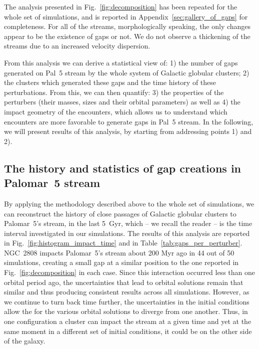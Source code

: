 \documentclass[draft]{aa}
\begin{document}
    The analysis presented in Fig.~\ref{fig:decomposition} has been repeated for the whole set of simulations, and is reported in Appendix~\ref{sec:gallery_of_gaps} for completeness. For all of the streams, morphologically speaking, the only changes appear to be the existence of gaps or not. We do not observe a thickening of the streams due to an increased velocity dispersion. 
    
    From this analysis we can derive a statistical view of: 1) the number of gaps generated on Pal~5 stream by the whole system of Galactic globular clusters; 2) the clusters which generated these gaps and the time history of these perturbations. From this, we can then quantify: 3) the properties of the perturbers (their masses, sizes and their orbital parameters) as well as 4) the impact geometry of the encounters, which allows us to understand which encounters are more favorable to generate gaps in Pal~5 stream. In the following, we will present results of this analysis, by starting from addressing points 1) and 2).





  \subsection{The history and statistics of gap creations in Palomar~5 stream}\label{sect:history}
  

      


    By applying the methodology described above to the whole set of simulations, we can reconstruct the history of close passages of Galactic globular clusters to Palomar~5's stream, in the last 5~Gyr, which -- we recall the reader -- is the time interval investigated in our simulations. The results of this analysis are reported in Fig.~\ref{fig:histogram_impact_time} and in Table~\ref{tab:gaps_per_perturber}. NGC~2808 impacts Palomar~5's stream about 200 Myr ago in 44 out of 50 simulations, creating a small gap at a similar position to the one reported in Fig.~\ref{fig:decomposition} in each case. Since this interaction occurred less than one orbital period ago, the uncertainties that lead to orbital solutions remain that similar and thus producing consistent results across all simulations. However, as we continue to turn back time further, the uncertainties in the initial conditions allow the for the various orbital solutions to diverge from one another. Thus, in one configuration a cluster can impact the stream at a given time and yet at the same moment in a different set of initial conditions, it could be on the other side of the galaxy.
    
\end{document}
